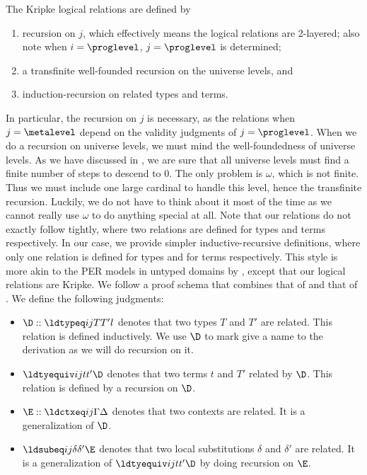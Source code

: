 The Kripke logical relations are defined by
\begin{enumerate}
\item recursion on $j$, which effectively means the logical relations are
  2-layered; also note when $i = \proglevel$, $j = \proglevel$ is determined;
\item a transfinite well-founded recursion on the universe levels, and
\item induction-recursion on related types and terms. 
\end{enumerate}
In particular, the recursion on $j$ is necessary, as the relations when $j = \metalevel$ depend
on the validity judgments of $j = \proglevel$. %
When we do a recursion on universe levels, we must mind the well-foundedness of
universe levels. %
As we have discussed in , we are sure that all universe
levels must find a finite number of steps to descend to $0$. %
The only problem is $\omega$, which is not finite. %
Thus we must include one large cardinal to handle this level, hence the transfinite
recursion. %
Luckily, we do not have to think about it most of the time as we cannot really use
$\omega$ to do anything special at all. %
Note that our relations do not exactly follow \citet{abel_decidability_2017} tightly,
where two relations are defined for types and terms respectively. %
In our case, we provide simpler inductive-recursive definitions, where only one
relation is defined for types and for terms respectively. %
This style is more akin to the PER models in untyped domains by
\citet{abel_normalization_2013,hu_jang_pientka_2023}, except that our logical
relations are Kripke. %
We follow a proof schema that combines that of \citet{abel_decidability_2017} and that
of \citet{abel_normalization_2013,hu_jang_pientka_2023}. %
We define the following judgments:
\begin{itemize}
\item $\D :: \ldtypeq i j T{T'} l$ denotes that two types $T$ and $T'$ are related. %
  This relation is defined inductively. %
  We use $\D$ to mark give a name to the derivation as we will do recursion on it. %
\item $\ldtyequiv i j t{t'} \D$ denotes that two terms $t$ and $T'$ related by $\D$. %
  This relation is defined by a recursion on $\D$. 
\item $\E :: \ldctxeq i j \Gamma \Delta$ denotes that two contexts are related. %
  It is a generalization of $\D$. 
\item $\ldsubeq i j \delta{\delta'} \E$ denotes that two local substitutions
  $\delta$ and $\delta'$ are related. %
  It is a generalization of $\ldtyequiv i j t{t'} \D$ by doing recursion on $\E$. 
\end{itemize}

